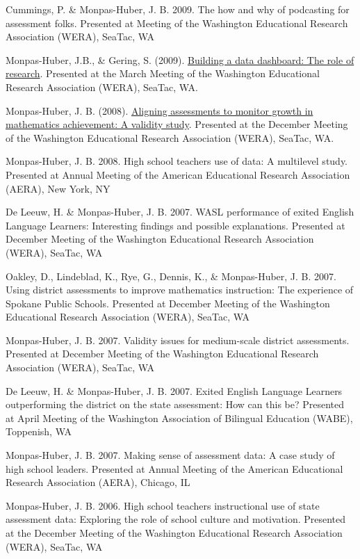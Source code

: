 \documentclass[
  letterpaper,
]{article}
\begin{document}
Cummings, P. \& Monpas-Huber, J. B. 2009. The how and why of podcasting
for assessment folks. Presented at Meeting of the Washington Educational
Research Association (WERA), SeaTac, WA

Monpas-Huber, J.B., \& Gering, S. (2009).
\href{https://github.com/jackbhuber/talks/blob/33f09160d92ba8e0b95636f9b9f241f7c17b160c/2009_BuildingADataDashboard_WERA_0309.pdf}{Building
a data dashboard: The role of research}. Presented at the March Meeting
of the Washington Educational Research Association (WERA), SeaTac, WA.

Monpas-Huber, J. B. (2008).
\href{https://github.com/jackbhuber/talks/blob/3b875e34bf6ebdf4c728c5869d45e086eb29548b/2008_AligningAssessments_WERA_1208.pdf}{Aligning
assessments to monitor growth in mathematics achievement: A validity
study}. Presented at the December Meeting of the Washington Educational
Research Association (WERA), SeaTac, WA.

Monpas-Huber, J. B. 2008. High school teachers use of data: A multilevel
study. Presented at Annual Meeting of the American Educational Research
Association (AERA), New York, NY

De Leeuw, H. \& Monpas-Huber, J. B. 2007. WASL performance of exited
English Language Learners: Interesting findings and possible
explanations. Presented at December Meeting of the Washington
Educational Research Association (WERA), SeaTac, WA

Oakley, D., Lindeblad, K., Rye, G., Dennis, K., \& Monpas-Huber, J. B.
2007. Using district assessments to improve mathematics instruction: The
experience of Spokane Public Schools. Presented at December Meeting of
the Washington Educational Research Association (WERA), SeaTac, WA

Monpas-Huber, J. B. 2007. Validity issues for medium-scale district
assessments. Presented at December Meeting of the Washington Educational
Research Association (WERA), SeaTac, WA

De Leeuw, H. \& Monpas-Huber, J. B. 2007. Exited English Language
Learners outperforming the district on the state assessment: How can
this be? Presented at April Meeting of the Washington Association of
Bilingual Education (WABE), Toppenish, WA

Monpas-Huber, J. B. 2007. Making sense of assessment data: A case study
of high school leaders. Presented at Annual Meeting of the American
Educational Research Association (AERA), Chicago, IL

Monpas-Huber, J. B. 2006. High school teachers instructional use of
state assessment data: Exploring the role of school culture and
motivation. Presented at the December Meeting of the Washington
Educational Research Association (WERA), SeaTac, WA
\end{document}
